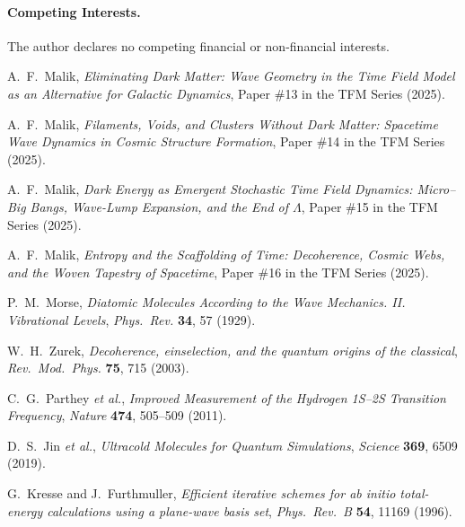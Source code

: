 \documentclass[12pt]{article}
\begin{document}
\paragraph{Competing Interests.}
The author declares no competing financial or non-financial interests.

\begin{thebibliography}{99}

A.~F.~Malik,
\textit{Eliminating Dark Matter: Wave Geometry in the Time Field Model as an Alternative for Galactic Dynamics},
Paper \#13 in the TFM Series (2025).

A.~F.~Malik,
\textit{Filaments, Voids, and Clusters Without Dark Matter: Spacetime Wave Dynamics in Cosmic Structure Formation},
Paper \#14 in the TFM Series (2025).

A.~F.~Malik,
\textit{Dark Energy as Emergent Stochastic Time Field Dynamics: Micro--Big Bangs, Wave-Lump Expansion, and the End of \(\Lambda\)},
Paper \#15 in the TFM Series (2025).

A.~F.~Malik,
\textit{Entropy and the Scaffolding of Time: Decoherence, Cosmic Webs, and the Woven Tapestry of Spacetime},
Paper \#16 in the TFM Series (2025).

P.~M.~Morse,
\textit{Diatomic Molecules According to the Wave Mechanics. II. Vibrational Levels},
\textit{Phys.\ Rev.} \textbf{34}, 57 (1929).

W.~H.~Zurek,
\textit{Decoherence, einselection, and the quantum origins of the classical},
\textit{Rev.\ Mod.\ Phys.} \textbf{75}, 715 (2003).

C.~G.~Parthey \emph{et al.},
\textit{Improved Measurement of the Hydrogen 1S--2S Transition Frequency},
\textit{Nature} \textbf{474}, 505--509 (2011).

D.~S.~Jin \emph{et al.},
\textit{Ultracold Molecules for Quantum Simulations},
\textit{Science} \textbf{369}, 6509 (2019).

G.~Kresse and J.~Furthmuller,
\textit{Efficient iterative schemes for ab initio total-energy calculations using a plane-wave basis set},
\textit{Phys.\ Rev.\ B} \textbf{54}, 11169 (1996).

\end{thebibliography}
\end{document}

